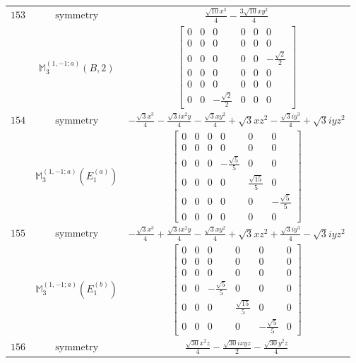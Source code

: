 \documentclass[fleqn,8pt,landscape]{jsarticle}
\begin{document}
\begin{longtable}{ccc}
$ 153 $ & $ \text{symmetry} $ & $ \frac{\sqrt{10} x^{3}}{4} - \frac{3 \sqrt{10} x y^{2}}{4} $ \\
$  $ & $ \mathbb{M}_{3}^{(1,-1;a)}(B,2) $ & $ \begin{bmatrix} 0 & 0 & 0 & 0 & 0 & 0 \\ 0 & 0 & 0 & 0 & 0 & 0 \\ 0 & 0 & 0 & 0 & 0 & - \frac{\sqrt{2}}{2} \\ 0 & 0 & 0 & 0 & 0 & 0 \\ 0 & 0 & 0 & 0 & 0 & 0 \\ 0 & 0 & - \frac{\sqrt{2}}{2} & 0 & 0 & 0 \end{bmatrix} $ \\ \hline
$ 154 $ & $ \text{symmetry} $ & $ - \frac{\sqrt{3} x^{3}}{4} - \frac{\sqrt{3} i x^{2} y}{4} - \frac{\sqrt{3} x y^{2}}{4} + \sqrt{3} x z^{2} - \frac{\sqrt{3} i y^{3}}{4} + \sqrt{3} i y z^{2} $ \\
$  $ & $ \mathbb{M}_{3}^{(1,-1;a)}(E_{1}^{(a)}) $ & $ \begin{bmatrix} 0 & 0 & 0 & 0 & 0 & 0 \\ 0 & 0 & 0 & 0 & 0 & 0 \\ 0 & 0 & 0 & - \frac{\sqrt{5}}{5} & 0 & 0 \\ 0 & 0 & 0 & 0 & \frac{\sqrt{15}}{5} & 0 \\ 0 & 0 & 0 & 0 & 0 & - \frac{\sqrt{5}}{5} \\ 0 & 0 & 0 & 0 & 0 & 0 \end{bmatrix} $ \\ \hline
$ 155 $ & $ \text{symmetry} $ & $ - \frac{\sqrt{3} x^{3}}{4} + \frac{\sqrt{3} i x^{2} y}{4} - \frac{\sqrt{3} x y^{2}}{4} + \sqrt{3} x z^{2} + \frac{\sqrt{3} i y^{3}}{4} - \sqrt{3} i y z^{2} $ \\
$  $ & $ \mathbb{M}_{3}^{(1,-1;a)}(E_{1}^{(b)}) $ & $ \begin{bmatrix} 0 & 0 & 0 & 0 & 0 & 0 \\ 0 & 0 & 0 & 0 & 0 & 0 \\ 0 & 0 & 0 & 0 & 0 & 0 \\ 0 & 0 & - \frac{\sqrt{5}}{5} & 0 & 0 & 0 \\ 0 & 0 & 0 & \frac{\sqrt{15}}{5} & 0 & 0 \\ 0 & 0 & 0 & 0 & - \frac{\sqrt{5}}{5} & 0 \end{bmatrix} $ \\ \hline
$ 156 $ & $ \text{symmetry} $ & $ \frac{\sqrt{30} x^{2} z}{4} - \frac{\sqrt{30} i x y z}{2} - \frac{\sqrt{30} y^{2} z}{4} $ \\

\end{longtable}
\end{document}
